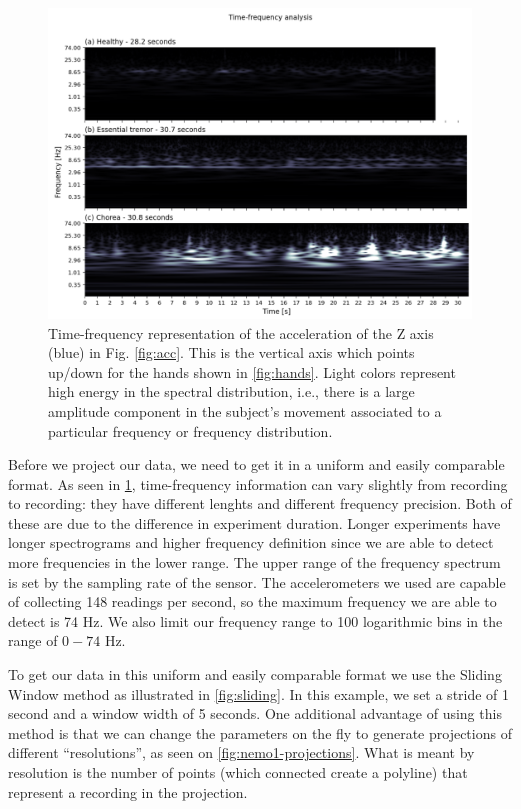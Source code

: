 
\begin{figure}[ht]
\centering
\includegraphics[width=\linewidth]{figures/nemo/freq2.png}
\caption{Time-frequency representation of the acceleration of the Z axis (blue) in Fig. \ref{fig:acc}. This is the vertical axis which points up/down for the hands shown in \cref{fig:hands}. Light colors represent high energy in the spectral distribution, i.e., there is a large amplitude component in the subject's movement associated to a particular frequency or frequency distribution. }
\label{fig:freq}
\end{figure}

Before we project our data, we need to get it in a uniform and easily comparable format. As seen in \cref{fig:freq}, time-frequency information can vary slightly from recording to recording: they have different lenghts and different frequency precision. Both of these are due to the difference in experiment duration. Longer experiments have longer spectrograms and higher frequency definition since we are able to detect more frequencies in the lower range. The upper range of the frequency spectrum is set by the sampling rate of the sensor. The accelerometers we used are capable of collecting 148 readings per second, so the maximum frequency we are able to detect is 74 Hz. We also limit our frequency range to 100 logarithmic bins in the range of $0-74$ Hz. 

To get our data in this uniform and easily comparable format we use the Sliding Window method as illustrated in \cref{fig:sliding}. In this example, we set a stride of 1 second and a window width of 5 seconds. One additional advantage of using this method is that we can change the parameters on the fly to generate projections of different ``resolutions'', as seen on \cref{fig:nemo1-projections}. What is meant by resolution is the number of points (which connected create a polyline) that represent a recording in the projection.


